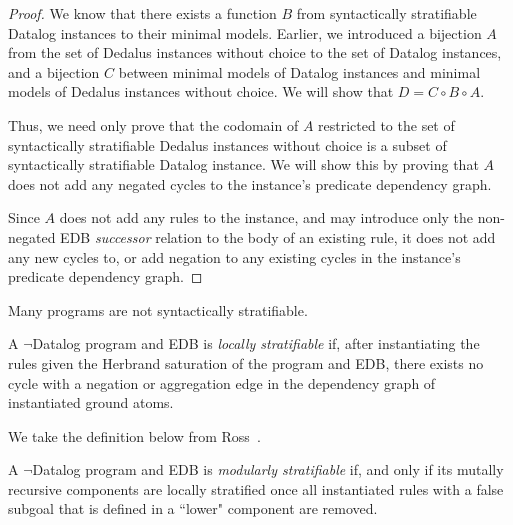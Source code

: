 \begin{proof}
%
We know that there exists a function $B$ from syntactically stratifiable
Datalog instances to their minimal models.  Earlier, we introduced  a bijection  $A$ from the set of
Dedalus instances without choice to the set of Datalog instances, and a
bijection $C$ between minimal models of Datalog instances and minimal models of
Dedalus instances without choice.  We will show that $D = C \circ B \circ A$.

Thus, we need only prove that the codomain of $A$ restricted to the set of
syntactically stratifiable Dedalus instances without choice is a subset of
syntactically stratifiable Datalog instance.  We will show this by proving that
$A$ does not add any negated cycles to the instance's predicate dependency
graph.  

Since $A$ does not add any rules to the instance, and may introduce only the
non-negated EDB {\em successor} relation to the body of an existing rule, it
does not add any new cycles to, or add negation to any existing cycles in the
instance's predicate dependency graph.
%
\end{proof}

Many programs are not syntactically stratifiable.  


\begin{definition}
%
A $\lnot$Datalog program and EDB is \emph{locally stratifiable} if, after instantiating the rules
given the Herbrand saturation of the program and EDB, there exists no cycle with a negation 
or aggregation edge in the dependency graph of instantiated ground atoms.
%
\end{definition}


We take the definition below from Ross~\cite{modular, ross-syntactic}.
\begin{definition}
%
A $\lnot$Datalog program and EDB is \emph{modularly stratifiable} if, and only if its mutally recursive 
components are locally stratified once all instantiated rules with a false subgoal that is defined in a 
``lower" component are removed.
\end{definition}


